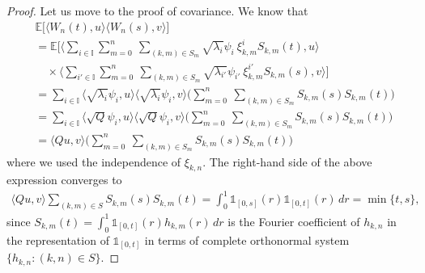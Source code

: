 \documentclass[10pt,a4paper]{amsart}
\newcommand{\EE}{ \mathbb{E} }
\begin{document}
\begin{proof}
Let us move to the proof of covariance. We know that 
\begin{align*}
&	\mathbb{E}\Big[\langle W_n(t),u\rangle \langle W_n(s),v\rangle \Big]\\&=\EE \Bigg[ \Big\langle\sum_{i\in\mathbb{I}}\sum_{m=0}^{n}\ \sum_{(k,m)\in S_{m}}\sqrt{\lambda_i }\psi_i \ \xi_{k,m} ^iS_{k,m}(t),u\Big\rangle\\&\quad \times \Big\langle \sum_{i'\in\mathbb{I}}\sum_{m=0}^{n}\ \sum_{(k,m)\in S_{m}}\sqrt{\lambda_{i'} }\psi_{i'} \ \xi_{k,m}^{i'} S_{k,m}(s),v\Big\rangle\Bigg]
\\&=
\sum_{i\in\mathbb{I}}\langle\sqrt{\lambda_i }\psi_i ,u\rangle\langle \sqrt{\lambda_i }\psi_i ,v\rangle\Bigg(
\sum_{m=0}^{n}\ \sum_{(k,m)\in S_{m}} S_{k,m}(s) S_{k,m}(t)\Bigg)
\\&=
\sum_{i\in\mathbb{I}}\langle\sqrt{Q}\psi_i ,u\rangle\langle \sqrt{Q}\psi_i ,v\rangle\Bigg(
\sum_{m=0}^{n}\ \sum_{(k,m)\in S_{m}} S_{k,m}(s) S_{k,m}(t)\Bigg)
\\&=
\langle Qu,v\rangle\Bigg(
\sum_{m=0}^{n}\ \sum_{(k,m)\in S_{m}} S_{k,m}(s) S_{k,m}(t)\Bigg)
\end{align*}where we used the independence of $\xi_{k,n}$. The right-hand side of the above expression converges to 
\begin{align*}
	\langle Qu,v\rangle
 \sum_{(k,m)\in S} S_{k,m}(s) S_{k,m}(t)= \int_0^1 \mathds{1}_{[0,s]} (r)\mathds{1}_{[0,t]}(r)\, d r=\min\{t,s\},
\end{align*}since $\displaystyle S_{k,m}(t)=\int_0^1\mathds{1}_{[0,t]}(r)h_{k,m}(r)\, dr$ is the Fourier coefficient of $h_{k,n}$ in the representation of $\mathds{1}_{[0,t]}$ in terms of complete orthonormal system $\{h_{k,n}:(k,n)\in S\}$.
\end{proof}
\end{document}
